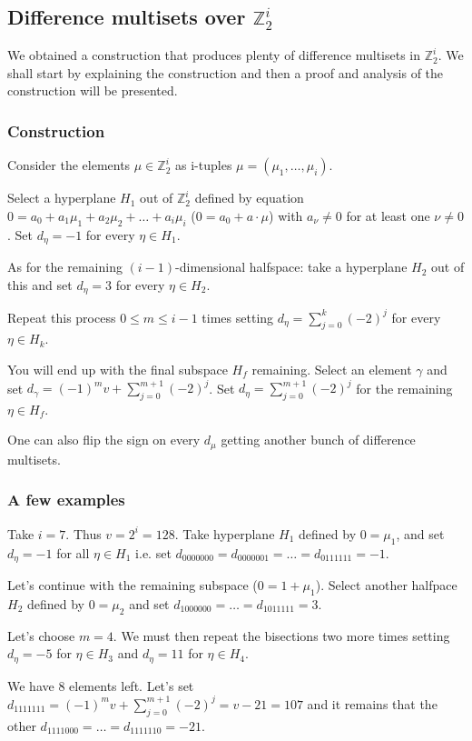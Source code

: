 \subsection{Difference multisets over $\mathbb Z_2^i$}
    \label{sec:z2n}
    We obtained a construction that produces plenty of difference multisets in $\mathbb Z_2^i$. We shall start by explaining the construction and then a proof and analysis of the construction will be presented.

    \subsubsection{Construction}
        Consider the elements $\mu \in \mathbb Z_2^i$ as i-tuples $\mu=(\mu_1, \ldots, \mu_i)$.
        
        Select a hyperplane $H_1$ out of $\mathbb Z_2^i$ defined by equation $0 = a_0 + a_1 \mu_1 + a_2 \mu_2 + \ldots + a_i \mu_i$ ($0=a_0+a\cdot \mu$) with $a_\nu \neq 0$ for at least one $\nu \neq 0$. Set $d_\eta = -1$ for every $\eta \in H_1$.
        
        As for the remaining $(i-1)$-dimensional halfspace: take a hyperplane $H_2$ out of this and set $d_\eta = 3$ for every $\eta \in H_2$.
        
        Repeat this process $0 \leq m \leq i-1$ times setting $d_\eta = \sum\limits_{j=0}^k (-2)^j$ for every $\eta \in H_k$.
        
        You will end up with the final subspace $H_f$ remaining. Select an element $\gamma$ and set $d_\gamma = (-1)^m v + \sum\limits_{j=0}^{m+1} (-2)^j$. Set $d_\eta = \sum\limits_{j=0}^{m+1} (-2)^j$ for the remaining $\eta \in H_f$.
        
        One can also flip the sign on every $d_\mu$ getting another bunch of difference multisets.
        
    \subsubsection{A few examples}
        
        \begin{example}
            Take $i=7$. Thus $v=2^i=128$. Take hyperplane $H_1$ defined by $0=\mu_1$, and set $d_\eta=-1$ for all $\eta\in H_1$ i.e. set $d_{0000000}=d_{0000001}=\ldots=d_{0111111}=-1$.
            
            Let's continue with the remaining subspace ($0=1+\mu_1$). Select another halfpace $H_2$ defined by $0=\mu_2$ and set $d_{1000000}=\ldots=d_{1011111}=3$.
            
            Let's choose $m=4$. We must then repeat the bisections two more times setting $d_\eta=-5$ for $\eta\in H_3$ and $d_\eta=11$ for $\eta \in H_4$.
            
            We have 8 elements left. Let's set $d_{1111111} = (-1)^{m} v + \sum\limits_{j=0}^{m+1} (-2)^j = v - 21 = 107$ and it remains that the other $d_{1111000}=\ldots=d_{1111110}=-21$.
        \end{example}
        

